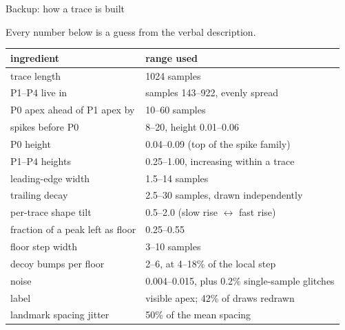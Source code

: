 \begin{frame}{Backup: how a trace is built}
  \vspace{0pt}\par
  {\footnotesize Every number below is a guess from the verbal description.
   }
  \par\vspace{3pt}
  \centering\footnotesize
  \begin{tabular}{@{}l l@{}}
    \toprule
    \color{cmsaccent}\textbf{ingredient} & \color{cmsaccent}\textbf{range used} \\
    \midrule
    trace length                       & 1024 samples \\
    P1--P4 live in                     & samples 143--922, evenly spread \\
    P0 apex ahead of P1 apex by        & 10--60 samples \\
    spikes before P0                   & 8--20, height 0.01--0.06 \\
    P0 height                          & 0.04--0.09 (top of the spike family) \\
    P1--P4 heights                     & 0.25--1.00, increasing within a trace \\
    leading-edge width                 & 1.5--14 samples \\
    trailing decay                     & 2.5--30 samples, drawn independently \\
    per-trace shape tilt               & 0.5--2.0 (slow rise $\leftrightarrow$ fast rise) \\
    fraction of a peak left as floor   & 0.25--0.55 \\
    floor step width                   & 3--10 samples \\
    decoy bumps per floor              & 2--6, at 4--18\% of the local step \\
    noise                              & 0.004--0.015, plus 0.2\% single-sample glitches \\
    label                              & visible apex; 42\% of draws redrawn \\
    landmark spacing jitter            & 50\% of the mean spacing \\
    \bottomrule
  \end{tabular}
\end{frame}

